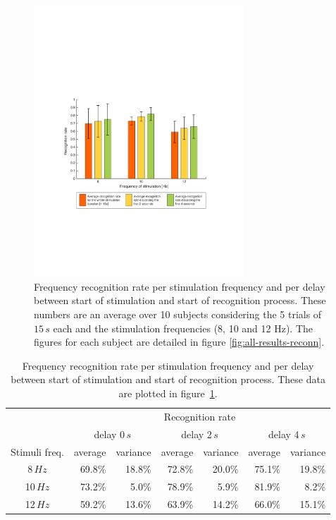 \documentclass[smallextended]{svjour3}
\begin{document}
\begin{figure}
\center
\includegraphics[width=0.7\textwidth]{figures/taux-reconn.pdf}
\caption{Frequency recognition rate per stimulation frequency and per delay between start of stimulation and start of recognition process. These numbers are an average over 10 subjects considering the 5 trials of $15\,s$ each and the stimulation frequencies (8, 10 and 12 Hz). The figures for each subject are detailed in figure \ref{fig:all-results-reconn}.}
\label{fig:taux-reconn}
\end{figure}

\begin{table}\begin{center}
    \begin{tabular}{ c | r | r | r | r | r | r |}
        & \multicolumn{6}{c|}{Recognition rate} \\ 
        & \multicolumn{2}{c|}{delay 0\,$s$} & \multicolumn{2}{c|}{delay 2\,$s$} & \multicolumn{2}{c|}{delay 4\,$s$} \\ 
        Stimuli freq.& average & variance & average & variance & average & variance \\ \hline

         8\,$Hz$ & 69.8\% & 18.8\% & 72.8\% & 20.0\% & 75.1\% & 19.8\% \\
        10\,$Hz$ & 73.2\% &  5.0\% & 78.9\% & 5.9\% & 81.9\% & 8.2\% \\
        12\,$Hz$ & 59.2\% & 13.6\% & 63.9\% & 14.2\% & 66.0\% & 15.1\% \\
    \end{tabular}
    \caption{Frequency recognition rate per stimulation frequency and per delay between start of stimulation and start of recognition process. These data are plotted in figure~\ref{fig:taux-reconn}.}
\end{center}\end{table}
\end{document}
